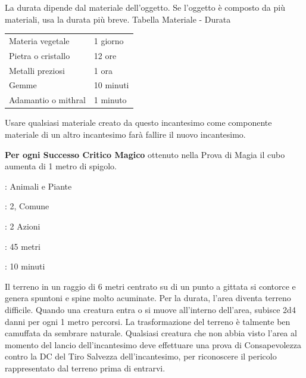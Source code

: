 \begin{multicols}{2}
La durata dipende dal materiale dell'oggetto. Se l'oggetto è composto da più materiali, usa la durata più breve.
\medskip
Tabella Materiale - Durata
\medskip

\noindent\begin{tabularx}{\linewidth}{lX}
	\toprule
 \rowcolor{gray!20}Materia vegetale &1 giorno\\
	Pietra o cristallo &12 ore\\
 \rowcolor{gray!20}Metalli preziosi &1 ora\\
	Gemme &10 minuti\\
 \rowcolor{gray!20}Adamantio o mithral &1 minuto
\end{tabularx}
\medskip

Usare qualsiasi materiale creato da questo incantesimo come componente materiale di un altro incantesimo farà fallire il nuovo incantesimo.

\textbf{Per ogni Successo Critico Magico} ottenuto nella Prova di Magia il cubo aumenta di 1 metro di spigolo.

\noindent\colorbox{OBSSgold!10}{
\begin{minipage}{0.95\linewidth}
\begin{description}[noitemsep, topsep=0pt, parsep=0pt, partopsep=0pt, leftmargin=0cm, labelwidth=1.3cm]
	\item[\textbf{Lista}]: Animali e Piante
	\item[\textbf{Livello}]: 2, Comune
	\item[\textbf{Lancio}]: 2 Azioni
	\item[\textbf{Gittata}]: 45 metri
	\item[\textbf{Durata}]: 10 minuti
\end{description}
\end{minipage}}\smallskip

Il terreno in un raggio di 6 metri centrato su di un punto a gittata si contorce e genera spuntoni e spine molto acuminate. Per la durata, l'area diventa terreno difficile. Quando una creatura entra o si muove all'interno dell'area, subisce 2d4 danni per ogni 1 metro percorsi.
La trasformazione del terreno è talmente ben camuffata da sembrare naturale. Qualsiasi creatura che non abbia visto l'area al momento del lancio dell'incantesimo deve effettuare una prova di Consapevolezza contro la DC del Tiro Salvezza dell'incantesimo, per riconoscere il pericolo rappresentato dal terreno prima di entrarvi.


\end{multicols}
